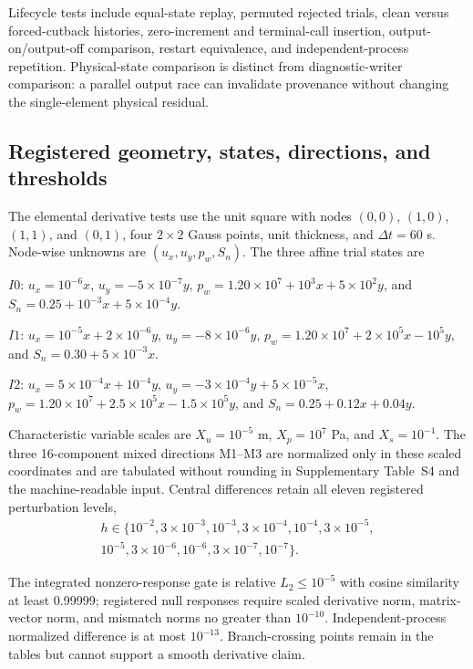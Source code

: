 \documentclass[preprint,12pt,authoryear]{elsarticle}
\begin{document}
Lifecycle tests include equal-state replay, permuted rejected trials, clean versus forced-cutback histories, zero-increment and terminal-call insertion, output-on/output-off comparison, restart equivalence, and independent-process repetition. Physical-state comparison is distinct from diagnostic-writer comparison: a parallel output race can invalidate provenance without changing the single-element physical residual.

\subsection{Registered geometry, states, directions, and thresholds}

The elemental derivative tests use the unit square with nodes $(0,0)$, $(1,0)$, $(1,1)$, and $(0,1)$, four $2\times2$ Gauss points, unit thickness, and $\Delta t=60$ s. Node-wise unknowns are $(u_x,u_y,p_w,S_n)$. The three affine trial states are

\noindent $I0$: $u_x=10^{-6}x$, $u_y=-5\times10^{-7}y$,
$p_w=1.20\times10^7+10^3x+5\times10^2y$, and
$S_n=0.25+10^{-3}x+5\times10^{-4}y$.

\noindent $I1$: $u_x=10^{-5}x+2\times10^{-6}y$, $u_y=-8\times10^{-6}y$,
$p_w=1.20\times10^7+2\times10^5x-10^5y$, and
$S_n=0.30+5\times10^{-3}x$.

\noindent $I2$: $u_x=5\times10^{-4}x+10^{-4}y$,
$u_y=-3\times10^{-4}y+5\times10^{-5}x$,
$p_w=1.20\times10^7+2.5\times10^5x-1.5\times10^5y$, and
$S_n=0.25+0.12x+0.04y$.

Characteristic variable scales are $X_u=10^{-5}$ m, $X_p=10^7$ Pa, and $X_s=10^{-1}$. The three 16-component mixed directions M1--M3 are normalized only in these scaled coordinates and are tabulated without rounding in Supplementary Table~S4 and the machine-readable input. Central differences retain all eleven registered perturbation levels,
\begin{multline}
h\in\{10^{-2},3\times10^{-3},10^{-3},3\times10^{-4},10^{-4},3\times10^{-5},\\
10^{-5},3\times10^{-6},10^{-6},3\times10^{-7},10^{-7}\}.
\end{multline}

The integrated nonzero-response gate is relative $L_2\le10^{-5}$ with cosine similarity at least 0.99999; registered null responses require scaled derivative norm, matrix-vector norm, and mismatch norms no greater than $10^{-10}$. Independent-process normalized difference is at most $10^{-13}$. Branch-crossing points remain in the tables but cannot support a smooth derivative claim.
\end{document}
